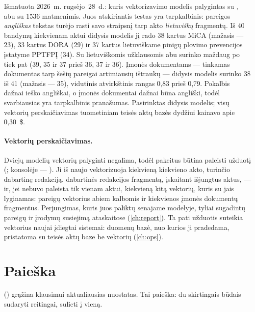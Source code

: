 \begin{lessonbox}{Išmatuota 2026~m. rugsėjo~28~d.: kuris vektorizavimo modelis}
 palygintas su , abu su 1536
matmenimis. Juos atskiriantis testas yra tarpkalbinis: pareigos \emph{angliškas} tekstas turėjo
rasti savo straipsnį tarp akto \emph{lietuviškų} fragmentų. Iš 40 bandymų kiekvienam aktui
didysis modelis jį rado 38 kartus MiCA (mažasis --- 23), 33 kartus DORA (29) ir 37 kartus
lietuviškame pinigų plovimo prevencijos įstatyme PPTFPĮ (34). Su lietuviškomis užklausomis abu surinko maždaug po tiek pat (39, 35
ir 37 prieš 36, 37 ir 36). Įmonės dokumentams --- tinkamas dokumentas tarp šešių pareigai
artimiausių ištraukų --- didysis modelis surinko 38 iš 41 (mažasis --- 35), vidutinis
atvirkštinis rangas 0,83 prieš 0,79. Pokalbis dažnai ieško angliškai, o įmonės dokumentai
dažnai būna angliški, todėl svarbiausias yra tarpkalbinis pranašumas. Pasirinktas didysis
modelis; visų vektorių perskaičiavimas tuometiniam teisės aktų bazės dydžiui kainavo apie 0,30~\$.
\end{lessonbox}

\paragraph{Vektorių perskaičiavimas.} Dviejų modelių vektorių palyginti negalima, todėl
pakeitus  būtina paleisti užduotį 
(; konsolėje --- ). Ji iš
naujo vektorizuoja kiekvieną kiekvieno akto, turinčio dabartinę redakciją, dabartinės redakcijos
fragmentą, įskaitant išjungtus aktus, --- ir, jei nebuvo paleista tik vienam aktui, kiekvieną
kitą vektorių, kuris su jais lyginamas: pareigų vektorius abiem kalbomis ir kiekvienos įmonės
dokumentų fragmentus. Perjungimas, kuris juos paliktų senajame modelyje, tyliai sugadintų
pareigų ir įrodymų susiejimą ataskaitose (\cref{ch:report}). Ta pati užduotis suteikia vektorius
naujai įdiegtai sistemai: duomenų bazė, nuo kurios ji pradedama, pristatoma su teisės aktų baze
be vektorių (\cref{ch:ops}).


\section{Paieška}\label{sec:corpus:search}

 () grąžina klausimui aktualiausias nuostatas. Tai
 paieška: du skirtingais būdais sudaryti reitingai, sulieti į vieną.

